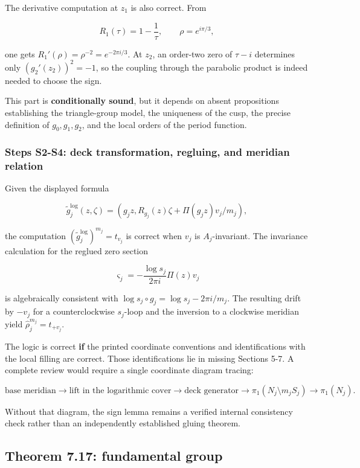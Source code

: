 \documentclass[
  10pt,
]{article}
\begin{document}
The derivative computation at \(z_1\) is also correct. From

\[
R_1(\tau)=1-\frac1\tau,\qquad \rho=e^{i\pi/3},
\]

one gets \(R_1'(\rho)=\rho^{-2}=e^{-2\pi i/3}\). At \(z_2\), an
order-two zero of \(\tau-i\) determines only \((g_2'(z_2))^2=-1\), so
the coupling through the parabolic product is indeed needed to choose
the sign.

This part is \textbf{conditionally sound}, but it depends on absent
propositions establishing the triangle-group model, the uniqueness of
the cusp, the precise definition of \(g_0,g_1,g_2\), and the local
orders of the period function.

\subsubsection{Steps S2-S4: deck transformation, regluing, and meridian
relation}\label{steps-s2-s4-deck-transformation-regluing-and-meridian-relation}

Given the displayed formula

\[
\widetilde g_j^{\log}(z,\zeta)
 =\left(g_jz,R_{g_j}(z)\zeta+\Pi(g_jz)v_j/m_j\right),
\]

the computation \((\widetilde g_j^{\log})^{m_j}=t_{v_j}\) is correct
when \(v_j\) is \(A_j\)-invariant. The invariance calculation for the
reglued zero section

\[
\varsigma_j=-\frac{\log s_j}{2\pi i}\Pi(z)v_j
\]

is algebraically consistent with
\(\log s_j\circ g_j=\log s_j-2\pi i/m_j\). The resulting drift by
\(-v_j\) for a counterclockwise \(s_j\)-loop and the inversion to a
clockwise meridian yield \(\widehat\rho_j^{m_j}=t_{+v_j}\).

The logic is correct \textbf{if} the printed coordinate conventions and
identifications with the local filling are correct. Those
identifications lie in missing Sections 5-7. A complete review would
require a single coordinate diagram tracing:

\[
\text{base meridian}\longrightarrow
\text{lift in the logarithmic cover}\longrightarrow
\text{deck generator}\longrightarrow
\pi_1(N_j\setminus m_jS_j)\longrightarrow\pi_1(N_j).
\]

Without that diagram, the sign lemma remains a verified internal
consistency check rather than an independently established gluing
theorem.

\subsection{Theorem 7.17: fundamental
group}\label{theorem-7.17-fundamental-group}
\end{document}
